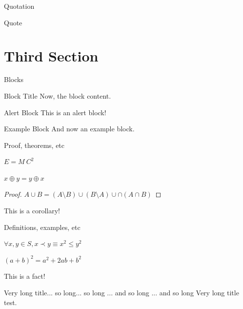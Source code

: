 \documentclass[handout, 10pt]{beamer}
\begin{document}
\begin{frame}{Quotation}
	\begin{quotation}
		\lipsum[20-20]
	\end{quotation}
\end{frame}


\begin{frame}{Quote}
	\begin{quote}
		\lipsum[100-100]
	\end{quote}
\end{frame}


\section{Third Section}

\begin{frame}{Blocks}
	\begin{block}{Block Title}
		Now, the block content.
	\end{block}

	\begin{alertblock}{Alert Block}
		This is an alert block!
	\end{alertblock}

	\begin{exampleblock}{Example Block}
		And now an example block.
	\end{exampleblock}
\end{frame}

\begin{frame}{Proof, theorems, etc}
	\begin{theorem}
		$E = M~C^{2}$
	\end{theorem}

	\begin{lemma}
		$x \oplus y = y \oplus x$
	\end{lemma}

	\begin{proof}
		$A \cup B = (A \setminus B) \cup (B \setminus A) \cup \cap (A \cap B)$
	\end{proof}

	\begin{corollary}
		This is a corollary!
	\end{corollary}


\end{frame}


\begin{frame}{Definitions, examples, etc}

	\begin{definition}
		$\forall x, y \in S, x \prec y \equiv x^{2} \le y^{2}$
	\end{definition}

	\begin{example}
		$(a + b)^{2} = a^{2} + 2ab + b^{2}$
	\end{example}

	\begin{fact}
		This is a fact!
	\end{fact}
\end{frame}

\begin{frame}{Very long title... so long... so long ... and so long ... and so long}
	Very long title test.
\end{frame}
\end{document}

